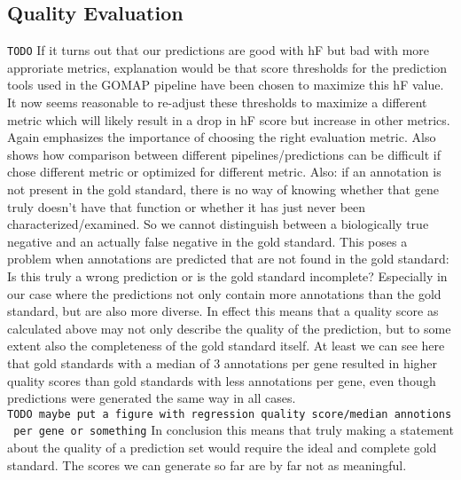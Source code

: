 \documentclass[utf8]{frontiersSCNS}
\begin{document}
\hypertarget{quality-evaluation-1}{%
\subsection{Quality Evaluation}\label{quality-evaluation-1}}

\texttt{TODO} If it turns out that our predictions are good with hF but bad with more approriate metrics, explanation would be that score thresholds for the prediction tools used in the GOMAP pipeline have been chosen to maximize this hF value. It now seems reasonable to re-adjust these thresholds to maximize a different metric which will likely result in a drop in hF score but increase in other metrics. Again emphasizes the importance of choosing the right evaluation metric.
Also shows how comparison between different pipelines/predictions can be difficult if chose different metric or optimized for different metric.
Also: if an annotation is not present in the gold standard, there is no way of knowing whether that gene truly doesn't have that function or whether it has just never been characterized/examined. So we cannot distinguish between a biologically true negative and an actually false negative in the gold standard.
This poses a problem when annotations are predicted that are not found in the gold standard: Is this truly a wrong prediction or is the gold standard incomplete? Especially in our case where the predictions not only contain more annotations than the gold standard, but are also more diverse.
In effect this means that a quality score as calculated above may not only describe the quality of the prediction, but to some extent also the completeness of the gold standard itself.
At least we can see here that gold standards with a median of 3 annotations per gene resulted in higher quality scores than gold standards with less annotations per gene, even though predictions were generated the same way in all cases.
\texttt{TODO\ maybe\ put\ a\ figure\ with\ regression\ quality\ score/median\ annotions\ per\ gene\ or\ something}
In conclusion this means that truly making a statement about the quality of a prediction set would require the ideal and complete gold standard.
The scores we can generate so far are by far not as meaningful.
\end{document}
